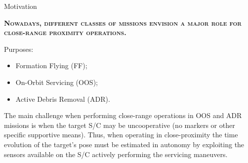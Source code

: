 \documentclass[10pt]{beamer}
\begin{document}
\begin{frame}{Motivation}

  \textsc{\textbf{\large Nowadays, different classes of missions envision a major role for close-range proximity operations.}}

  \bigskip

  \begin{minipage}[t]{0.4\textwidth}
    \vspace{0.01mm}
    Purposes:
  \end{minipage}%
  \begin{minipage}[t]{0.6\textwidth}
    \vspace{0.01mm}
    \begin{itemize}[label=$\bullet$]
      \item Formation Flying (FF);
      \item On-Orbit Servicing (OOS);
      \item Active Debris Removal (ADR).
    \end{itemize}
  \end{minipage}

  \bigskip

  The main challenge when performing close-range operations in OOS and ADR missions is when the target S/C may be \alert{uncooperative} (no markers or other specific supportive means). Thus, when operating in close-proximity the time evolution of the target's \alert{pose} must be estimated in autonomy by exploiting the sensors available on the S/C actively performing the servicing maneuvers.

\end{frame}
\end{document}
